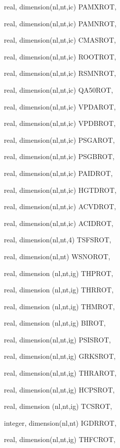 {\begin{DoxyParamCaption}
\item[{real, dimension(nl,nt,ic)}]{P\+A\+M\+X\+R\+O\+T, }
\item[{real, dimension(nl,nt,ic)}]{P\+A\+M\+N\+R\+O\+T, }
\item[{real, dimension(nl,nt,ic)}]{C\+M\+A\+S\+R\+O\+T, }
\item[{real, dimension(nl,nt,ic)}]{R\+O\+O\+T\+R\+O\+T, }
\item[{real, dimension(nl,nt,ic)}]{R\+S\+M\+N\+R\+O\+T, }
\item[{real, dimension(nl,nt,ic)}]{Q\+A50\+R\+O\+T, }
\item[{real, dimension(nl,nt,ic)}]{V\+P\+D\+A\+R\+O\+T, }
\item[{real, dimension(nl,nt,ic)}]{V\+P\+D\+B\+R\+O\+T, }
\item[{real, dimension(nl,nt,ic)}]{P\+S\+G\+A\+R\+O\+T, }
\item[{real, dimension(nl,nt,ic)}]{P\+S\+G\+B\+R\+O\+T, }
\item[{real, dimension(nl,nt,ic)}]{P\+A\+I\+D\+R\+O\+T, }
\item[{real, dimension(nl,nt,ic)}]{H\+G\+T\+D\+R\+O\+T, }
\item[{real, dimension(nl,nt,ic)}]{A\+C\+V\+D\+R\+O\+T, }
\item[{real, dimension(nl,nt,ic)}]{A\+C\+I\+D\+R\+O\+T, }
\item[{real, dimension(nl,nt,4)}]{T\+S\+F\+S\+R\+O\+T, }
\item[{real, dimension(nl,nt)}]{W\+S\+N\+O\+R\+O\+T, }
\item[{real, dimension (nl,nt,ig)}]{T\+H\+P\+R\+O\+T, }
\item[{real, dimension (nl,nt,ig)}]{T\+H\+R\+R\+O\+T, }
\item[{real, dimension (nl,nt,ig)}]{T\+H\+M\+R\+O\+T, }
\item[{real, dimension  (nl,nt,ig)}]{B\+I\+R\+O\+T, }
\item[{real, dimension(nl,nt,ig)}]{P\+S\+I\+S\+R\+O\+T, }
\item[{real, dimension(nl,nt,ig)}]{G\+R\+K\+S\+R\+O\+T, }
\item[{real, dimension(nl,nt,ig)}]{T\+H\+R\+A\+R\+O\+T, }
\item[{real, dimension(nl,nt,ig)}]{H\+C\+P\+S\+R\+O\+T, }
\item[{real, dimension (nl,nt,ig)}]{T\+C\+S\+R\+O\+T, }
\item[{integer, dimension(nl,nt)}]{I\+G\+D\+R\+R\+O\+T, }
\item[{real, dimension(nl,nt,ig)}]{T\+H\+F\+C\+R\+O\+T, }

\end{DoxyParamCaption}}
